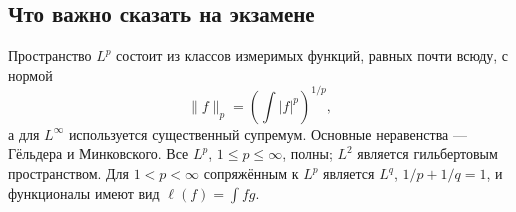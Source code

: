 \subsection{Что важно сказать на экзамене}

Пространство $L^p$ состоит из классов измеримых функций, равных почти всюду,
с нормой
\[
    \|f\|_p=\left(\int|f|^p\right)^{1/p},
\]
а для $L^\infty$ используется существенный супремум. Основные неравенства ---
Гёльдера и Минковского. Все $L^p$, $1\leq p\leq\infty$, полны; $L^2$ является
гильбертовым пространством. Для $1<p<\infty$ сопряжённым к $L^p$ является
$L^q$, $1/p+1/q=1$, и функционалы имеют вид
$\ell(f)=\int fg$.

\newpage
